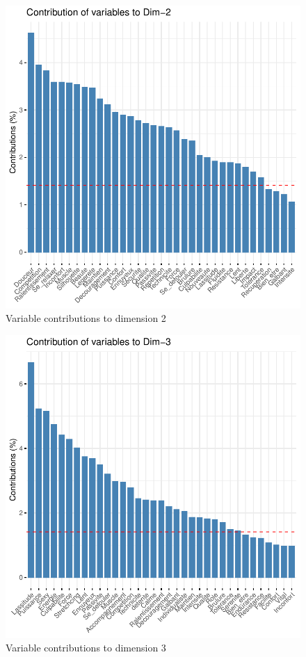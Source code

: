 \documentclass[12pt]{article}
\begin{document}
\begin{figure}[H]
\begin{center}
\includegraphics[scale=1.1]{ACP_2.pdf} 
\caption[]{ Variable contributions to  dimension 2 }
\end{center}
\end{figure}

\begin{figure}[H]
\begin{center}
\includegraphics[scale=1.1]{ACP_3.pdf} 
\caption[]{Variable contributions to  dimension 3 }
\end{center}
\end{figure}
\end{document}
